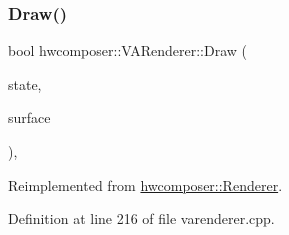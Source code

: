 \subsubsection{\texorpdfstring{Draw()}{Draw()}}
{\footnotesize\ttfamily bool hwcomposer\+::\+V\+A\+Renderer\+::\+Draw (\begin{DoxyParamCaption}\item[{const \mbox{\hyperlink{structhwcomposer_1_1MediaState}{Media\+State}} \&}]{state,  }\item[{\mbox{\hyperlink{classhwcomposer_1_1NativeSurface}{Native\+Surface}} $\ast$}]{surface }\end{DoxyParamCaption})\hspace{0.3cm}{\ttfamily [override]}, {\ttfamily [virtual]}}



Reimplemented from \mbox{\hyperlink{classhwcomposer_1_1Renderer_a3811bf639ba6fd9b9891daf0b051b98b}{hwcomposer\+::\+Renderer}}.



Definition at line 216 of file varenderer.\+cpp.


